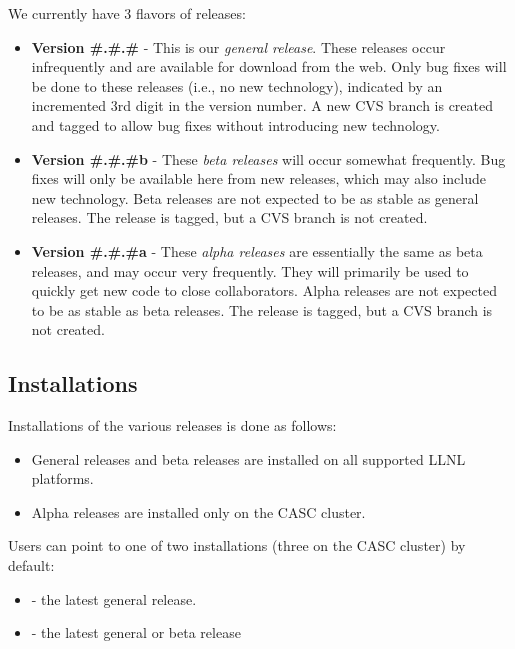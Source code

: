 \noindent
We currently have 3 flavors of releases:
\begin{itemize}
\item {\bf Version \#.\#.\#} - This is our {\em general release}.  These
releases occur infrequently and are available for download from the
web.  Only bug fixes will be done to these releases (i.e., no new
technology), indicated by an incremented 3rd digit in the version
number.  A new CVS branch is created and tagged to allow bug fixes
without introducing new technology.

\item {\bf Version \#.\#.\#b} - These {\em beta releases} will occur somewhat
frequently.  Bug fixes will only be available here from new releases,
which may also include new technology.  Beta releases are not expected
to be as stable as general releases.  The release is tagged, but a CVS
branch is not created.

\item {\bf Version \#.\#.\#a} - These {\em alpha releases} are essentially
the same as beta releases, and may occur very frequently.  They will
primarily be used to quickly get new code to close collaborators.
Alpha releases are not expected to be as stable as beta releases.
The release is tagged, but a CVS branch is not created.
\end{itemize}

\subsection{Installations}
\label{Installations}

Installations of the various releases is done as follows:
\begin{itemize}
\item General releases and beta releases are installed on all
supported LLNL platforms.
\item Alpha releases are installed only on the CASC cluster.
\end{itemize}

\noindent
Users can point to one of two installations (three on the CASC
cluster) by default:
\begin{itemize}
\item {} - the latest general release.
\item {} - the latest general or beta release
\end{itemize}

